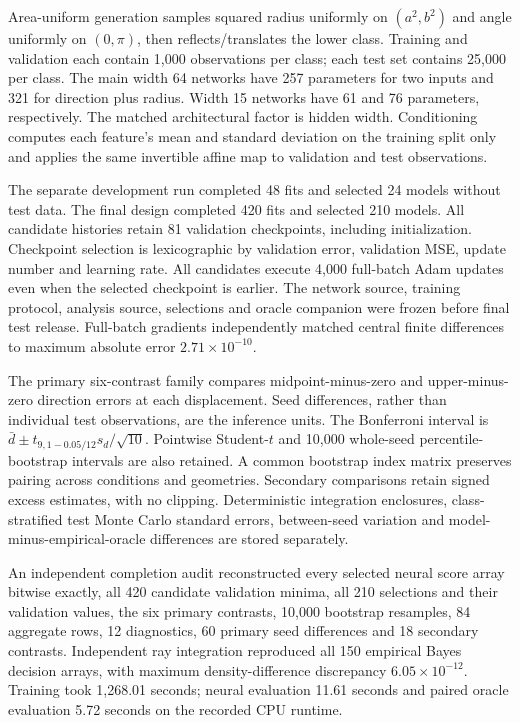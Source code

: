 \documentclass[10 pt,a 4 paper]{article}
\begin{document}
Area-uniform generation samples squared radius uniformly on $(a^2,b^2)$ and angle uniformly on $(0,\pi)$, then reflects/translates the lower class. Training and validation each contain 1,000 observations per class; each test set contains 25,000 per class. The main width 64 networks have 257 parameters for two inputs and 321 for direction plus radius. Width 15 networks have 61 and 76 parameters, respectively. The matched architectural factor is hidden width. Conditioning computes each feature's mean and standard deviation on the training split only and applies the same invertible affine map to validation and test observations.

The separate development run completed 48 fits and selected 24 models without test data. The final design completed 420 fits and selected 210 models. All candidate histories retain 81 validation checkpoints, including initialization. Checkpoint selection is lexicographic by validation error, validation MSE, update number and learning rate. All candidates execute 4,000 full-batch Adam updates even when the selected checkpoint is earlier. The network source, training protocol, analysis source, selections and oracle companion were frozen before final test release. Full-batch gradients independently matched central finite differences to maximum absolute error $2.71\times 10^{-10}$.

The primary six-contrast family compares midpoint-minus-zero and upper-minus-zero direction errors at each displacement. Seed differences, rather than individual test observations, are the inference units. The Bonferroni interval is $\bar d\pm t_{9,1-0.05/12}s_d/\sqrt{10}$. Pointwise Student-$t$ and 10,000 whole-seed percentile-bootstrap intervals are also retained. A common bootstrap index matrix preserves pairing across conditions and geometries. Secondary comparisons retain signed excess estimates, with no clipping. Deterministic integration enclosures, class-stratified test Monte Carlo standard errors, between-seed variation and model-minus-empirical-oracle differences are stored separately.

An independent completion audit reconstructed every selected neural score array bitwise exactly, all 420 candidate validation minima, all 210 selections and their validation values, the six primary contrasts, 10,000 bootstrap resamples, 84 aggregate rows, 12 diagnostics, 60 primary seed differences and 18 secondary contrasts. Independent ray integration reproduced all 150 empirical Bayes decision arrays, with maximum density-difference discrepancy $6.05\times 10^{-12}$. Training took 1,268.01 seconds; neural evaluation 11.61 seconds and paired oracle evaluation 5.72 seconds on the recorded CPU runtime.
\end{document}
